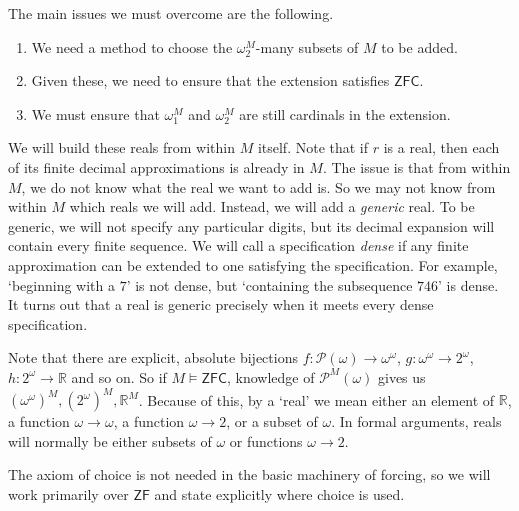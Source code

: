The main issues we must overcome are the following.
\begin{enumerate}
    \item We need a method to choose the \( \omega_2^M \)-many subsets of \( M \) to be added.
    \item Given these, we need to ensure that the extension satisfies \( \mathsf{ZFC} \).
    \item We must ensure that \( \omega_1^M \) and \( \omega_2^M \) are still cardinals in the extension.
\end{enumerate}
We will build these reals from within \( M \) itself.
Note that if \( r \) is a real, then each of its finite decimal approximations is already in \( M \).
The issue is that from within \( M \), we do not know what the real we want to add is.
So we may not know from within \( M \) which reals we will add.
Instead, we will add a \emph{generic} real.
To be generic, we will not specify any particular digits, but its decimal expansion will contain every finite sequence.
We will call a specification \emph{dense} if any finite approximation can be extended to one satisfying the specification.
For example, `beginning with a \( 7 \)' is not dense, but `containing the subsequence \( 746 \)' is dense.
It turns out that a real is generic precisely when it meets every dense specification.

Note that there are explicit, absolute bijections \( f : \mathcal P(\omega) \to \omega^\omega \), \( g : \omega^\omega \to 2^\omega \), \( h : 2^\omega \to \mathbb R \) and so on.
So if \( M \vDash \mathsf{ZFC} \), knowledge of \( \mathcal P^M(\omega) \) gives us \( (\omega^\omega)^M, (2^\omega)^M, \mathbb R^M \).
Because of this, by a `real' we mean either an element of \( \mathbb R \), a function \( \omega \to \omega \), a function \( \omega \to 2 \), or a subset of \( \omega \).
In formal arguments, reals will normally be either subsets of \( \omega \) or functions \( \omega \to 2 \).

The axiom of choice is not needed in the basic machinery of forcing, so we will work primarily over \( \mathsf{ZF} \) and state explicitly where choice is used.

